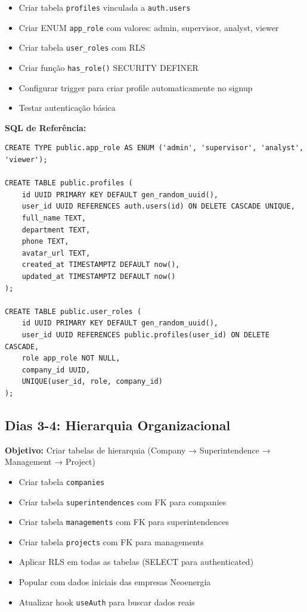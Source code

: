 \documentclass[12pt,a4paper]{article}
\newcommand{\checkbox}{$\square$}
\begin{document}
\begin{itemize}[label=\checkbox]
    \item Criar tabela \texttt{profiles} vinculada a \texttt{auth.users}
    \item Criar ENUM \texttt{app\_role} com valores: admin, supervisor, analyst, viewer
    \item Criar tabela \texttt{user\_roles} com RLS
    \item Criar função \texttt{has\_role()} SECURITY DEFINER
    \item Configurar trigger para criar profile automaticamente no signup
    \item Testar autenticação básica
\end{itemize}

\textbf{SQL de Referência:}
\begin{verbatim}
CREATE TYPE public.app_role AS ENUM ('admin', 'supervisor', 'analyst', 'viewer');

CREATE TABLE public.profiles (
    id UUID PRIMARY KEY DEFAULT gen_random_uuid(),
    user_id UUID REFERENCES auth.users(id) ON DELETE CASCADE UNIQUE,
    full_name TEXT,
    department TEXT,
    phone TEXT,
    avatar_url TEXT,
    created_at TIMESTAMPTZ DEFAULT now(),
    updated_at TIMESTAMPTZ DEFAULT now()
);

CREATE TABLE public.user_roles (
    id UUID PRIMARY KEY DEFAULT gen_random_uuid(),
    user_id UUID REFERENCES public.profiles(user_id) ON DELETE CASCADE,
    role app_role NOT NULL,
    company_id UUID,
    UNIQUE(user_id, role, company_id)
);
\end{verbatim}

\subsection{Dias 3-4: Hierarquia Organizacional}

\begin{tcolorbox}[colback=green!5!white,colframe=neogreen]
\textbf{Objetivo:} Criar tabelas de hierarquia (Company → Superintendence → Management → Project)
\end{tcolorbox}

\begin{itemize}[label=\checkbox]
    \item Criar tabela \texttt{companies}
    \item Criar tabela \texttt{superintendences} com FK para companies
    \item Criar tabela \texttt{managements} com FK para superintendences
    \item Criar tabela \texttt{projects} com FK para managements
    \item Aplicar RLS em todas as tabelas (SELECT para authenticated)
    \item Popular com dados iniciais das empresas Neoenergia
    \item Atualizar hook \texttt{useAuth} para buscar dados reais
\end{itemize}
\end{document}
